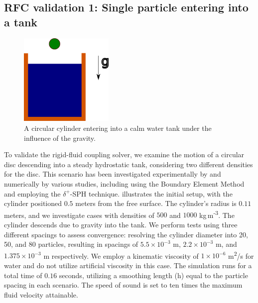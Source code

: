 \documentclass[preprint,12pt]{elsarticle}
\begin{document}
\FloatBarrier%
\subsection{RFC validation 1: Single particle entering into a tank}
\label{sec:rfc_validation_1_single_particle_entry}
\begin{figure}[!htpb]
  \centering
  \includegraphics[width=0.4\textwidth]{images/rfc_01_skillen_2013_particle_entry_in_hs_tank/Skillen_2013_particle_entry_in_hs_tank}
  \caption{A circular cylinder entering into a calm water tank under the
    influence of the gravity.}
  \label{fig:results_rfc_01_skillen_2013}
\end{figure}

To validate the rigid-fluid coupling solver, we examine the motion of a
circular disc descending into a steady hydrostatic tank, considering two
different densities for the disc. This scenario has been investigated
experimentally by
\citet{greenhow1983nonlinear} and
numerically by various studies, including
\citet{sun2006water} using the Boundary Element Method
and \cite{sun2018accurate} employing the $\delta^+$-SPH technique.
illustrates the initial setup, with the cylinder positioned $0.5$ meters from
the free surface. The cylinder's radius is $0.11$ meters, and we investigate
cases with densities of $500$ and $1000$ kg\,m\textsuperscript{-3}.
The cylinder descends due to gravity into the tank. We perform tests using
three different spacings to assess convergence: resolving the cylinder
diameter into 20, 50, and 80 particles, resulting in spacings of $5.5 \times 10^{-3}$ m,
$2.2 \times 10^{-3}$ m, and $1.375 \times 10^{-3}$ m respectively. We employ a kinematic viscosity of
$1 \times 10^{-6}$ m\textsuperscript{2}/s for water and do not utilize artificial
viscosity in this case. The simulation runs for a total time of $0.16$
seconds, utilizing a smoothing length (h) equal to the particle spacing in
each scenario. The speed of sound is set to ten times the maximum fluid
velocity attainable.
\end{document}
